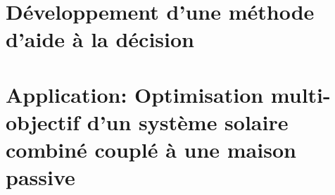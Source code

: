 \documentclass[11pt, oneside, fixOverflow]{JeremyThesis}
\begin{document}
\chapter{Développement d’une méthode d’aide à la décision}
% 

\chapter{Application: Optimisation multi-objectif d’un système solaire combiné couplé à une maison passive}
% 

% 


\newpage
\addappheadtotoc
\appendix
\appendixpage

% 
% 

% 

% 

% 

% 

\newpage
\printbibliography[title={Références bibliographiques}]
\end{document}
